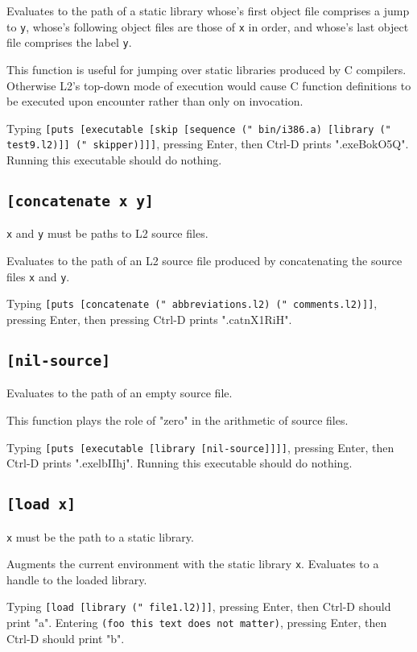 \documentclass[twocolumn,landscape]{article}
\begin{document}
      Evaluates to the path of a static library whose's first object file comprises a jump to \lstinline{y}, whose's following object files are those of \lstinline{x} in order, and whose's last object file comprises the label \lstinline{y}.

      This function is useful for jumping over static libraries produced by C compilers. Otherwise L2's top-down mode of execution would cause C function definitions to be executed upon encounter rather than only on invocation.

      Typing \lstinline{[puts [executable [skip [sequence (" bin/i386.a) [library (" test9.l2)]] (" skipper)]]]}, pressing Enter, then Ctrl-D prints ".exeBokO5Q". Running this executable should do nothing.

    \subsection{\lstinline{[concatenate x y]}}
      \lstinline{x} and \lstinline{y} must be paths to L2 source files.

      Evaluates to the path of an L2 source file produced by concatenating the source files \lstinline{x} and \lstinline{y}.

      Typing \lstinline{[puts [concatenate (" abbreviations.l2) (" comments.l2)]]}, pressing Enter, then pressing Ctrl-D prints ".catnX1RiH".

    \subsection{\lstinline{[nil-source]}}
      Evaluates to the path of an empty source file.

      This function plays the role of "zero" in the arithmetic of source files.

      Typing \lstinline{[puts [executable [library [nil-source]]]]}, pressing Enter, then Ctrl-D prints ".exelbIIhj". Running this executable should do nothing.

    \subsection{\lstinline{[load x]}}
      \lstinline{x} must be the path to a static library.

      Augments the current environment with the static library \lstinline{x}. Evaluates to a handle to the loaded library.

      Typing \lstinline{[load [library (" file1.l2)]]}, pressing Enter, then Ctrl-D should print "a". Entering \lstinline{(foo this text does not matter)}, pressing Enter, then Ctrl-D should print "b".
\end{document}
